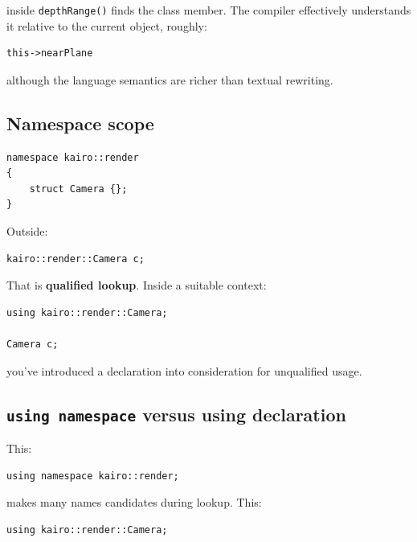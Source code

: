 inside \texttt{depthRange()} finds the class member. The compiler effectively understands it relative to the current object, roughly:

\begin{verbatim}
this->nearPlane
\end{verbatim}

although the language semantics are richer than textual rewriting.

\subsection{Namespace scope}\label{05-engine-i-ch002-namespace-scope}

\hypertarget{05-engine-i-ch002-namespace-scope}{}

\begin{verbatim}
namespace kairo::render
{
    struct Camera {};
}
\end{verbatim}

Outside:

\begin{verbatim}
kairo::render::Camera c;
\end{verbatim}

That is \textbf{qualified lookup}. Inside a suitable context:

\begin{verbatim}
using kairo::render::Camera;

Camera c;
\end{verbatim}

you've introduced a declaration into consideration for unqualified usage.

\subsection{\texorpdfstring{\texttt{using\ namespace} versus using declaration}{using namespace versus using declaration}}\label{05-engine-i-ch002-using-namespace-versus-using-declaration}

\hypertarget{05-engine-i-ch002-using-namespace-versus-using-declaration}{}

This:

\begin{verbatim}
using namespace kairo::render;
\end{verbatim}

makes many names candidates during lookup. This:

\begin{verbatim}
using kairo::render::Camera;
\end{verbatim}


